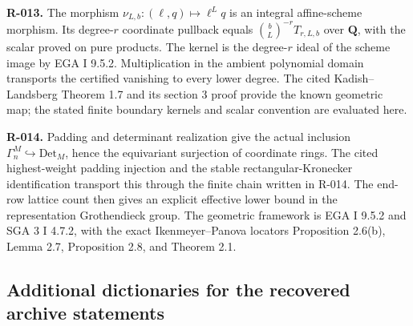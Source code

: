 \documentclass[
  10pt,
]{article}
\begin{document}
\textbf{R-013.} The morphism \(\nu_{L,b}:(\ell,q)\mapsto\ell^Lq\) is an
integral affine-scheme morphism. Its degree-\(r\) coordinate pullback
equals \(\binom bL^{-r}T_{r,L,b}\) over \(\mathbf Q\), with the scalar
proved on pure products. The kernel is the degree-\(r\) ideal of the
scheme image by EGA I 9.5.2. Multiplication in the ambient polynomial
domain transports the certified vanishing to every lower degree. The
cited Kadish--Landsberg Theorem 1.7 and its section 3 proof provide the
known geometric map; the stated finite boundary kernels and scalar
convention are evaluated here.

\textbf{R-014.} Padding and determinant realization give the actual
inclusion \(\Gamma_n^M\hookrightarrow\mathrm{Det}_M\), hence the
equivariant surjection of coordinate rings. The cited highest-weight
padding injection and the stable rectangular-Kronecker identification
transport this through the finite chain written in R-014. The end-row
lattice count then gives an explicit effective lower bound in the
representation Grothendieck group. The geometric framework is EGA I
9.5.2 and SGA 3 I 4.7.2, with the exact Ikenmeyer--Panova locators
Proposition 2.6(b), Lemma 2.7, Proposition 2.8, and Theorem 2.1.

\subsection{Additional dictionaries for the recovered archive
statements}\label{additional-dictionaries-for-the-recovered-archive-statements}
\end{document}
